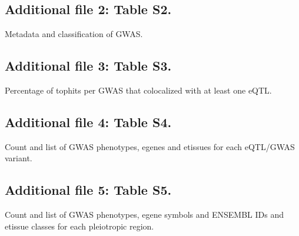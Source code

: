 \documentclass[doublespacing,linenumbers]{bmcart}
\begin{document}
\begin{backmatter}
        \subsection*{Additional file 2: Table S2.}
        Metadata and classification of GWAS.

        \subsection*{Additional file 3: Table S3.}
        Percentage of tophits per GWAS that colocalized with at least one eQTL.

        \subsection*{Additional file 4: Table S4.}
        Count and list of GWAS phenotypes, egenes and etissues for each eQTL/GWAS variant.

        \subsection*{Additional file 5: Table S5.}
        Count and list of GWAS phenotypes, egene symbols and ENSEMBL IDs and etissue classes for each pleiotropic region.

    \end{backmatter}
\end{document}
